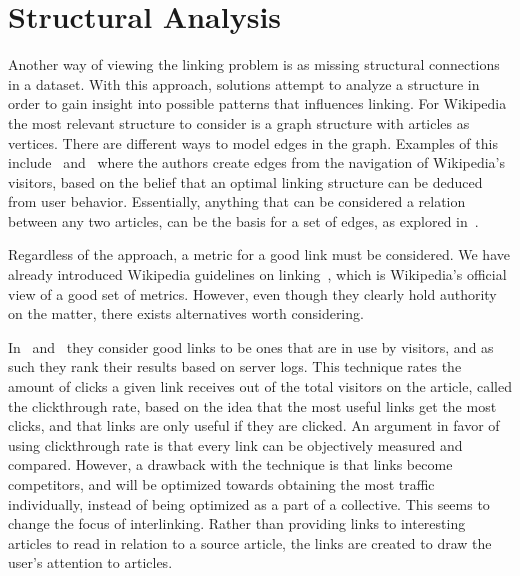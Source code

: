 \section{Structural Analysis}\label{related_structural_analysis}
Another way of viewing the linking problem is as missing structural connections in a dataset. With this approach, solutions attempt to analyze a structure in order to gain insight into possible patterns that influences linking. For Wikipedia the most relevant structure to consider is a graph structure with articles as vertices. There are different ways to model edges in the graph. Examples of this include~\cite{hyperlink-structure-using-logs} and~\cite{west2015mining} where the authors create edges from the navigation of Wikipedia's visitors, based on the belief that an optimal linking structure can be deduced from user behavior. Essentially, anything that can be considered a relation between any two articles, can be the basis for a set of edges, as explored in~\cite{lu2011link}.

Regardless of the approach, a metric for a good link must be considered. We have already introduced Wikipedia guidelines on linking~\cite{wiki-editor-guidelines}, which is Wikipedia's official view of a good set of metrics. However, even though they clearly hold authority on the matter, there exists alternatives worth considering.

In~\cite{hyperlink-structure-using-logs} and~\cite{west2015mining} they consider good links to be ones that are in use by visitors, and as such they rank their results based on server logs.  This technique rates the amount of clicks a given link receives out of the total visitors on the article, called the clickthrough rate, based on the idea that the most useful links get the most clicks, and that links are only useful if they are clicked. An argument in favor of using clickthrough rate is that every link can be objectively measured and compared. However, a drawback with the technique is that links become competitors, and will be optimized towards obtaining the most traffic individually, instead of being optimized as a part of a collective.  This seems to change the focus of interlinking. Rather than providing links to interesting articles to read in relation to a source article, the links are created to draw the user's attention to articles.

